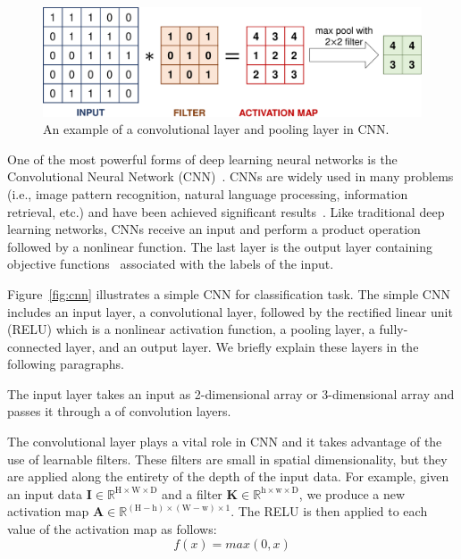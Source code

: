 \begin{figure}[t!]
	\center
	\includegraphics[scale=0.28]{figs/filter_pooling.pdf}
	\caption{An example of a convolutional layer and pooling layer in CNN.}
	\label{fig:filter}
\end{figure}

One of the most powerful forms of deep learning neural networks is the Convolutional Neural Network (CNN)~\cite{lecun2015deep}. CNNs are widely used in many problems (i.e., image pattern recognition, natural language processing, information retrieval, etc.) and have been achieved significant results~\cite{karpathy2014large, lawrence1997face, krizhevsky2012imagenet}. Like traditional deep learning networks, CNNs receive an input and perform a product operation followed by a nonlinear function. The last layer is the output layer containing objective functions~\cite{zhao2017loss} associated with the labels of the input.

Figure~\ref{fig:cnn} illustrates a simple CNN for classification task. The simple CNN includes an input layer, a convolutional layer, followed by the rectified linear unit (RELU) which is a nonlinear activation function, a pooling layer, a fully-connected layer, and an output layer. We briefly explain these layers in the following paragraphs. 

The input layer takes an input as 2-dimensional array or 3-dimensional array and passes it through a of convolution layers.

The convolutional layer plays a vital role in CNN and it takes advantage of the use of learnable filters. These filters are small in spatial dimensionality, but they are applied along the entirety of the depth of the input data. For example, given an input data $\textbf{I} \in \mathbb{R}^{\text{H} \times \text{W} \times \text{D}}$ and a filter $\textbf{K} \in \mathbb{R}^{\text{h} \times \text{w} \times \text{D}}$, we produce a new activation map $\textbf{A} \in \mathbb{R}^{(\text{H} - \text{h}) \times (\text{W} - \text{w}) \times 1}$. The RELU is then applied to each value of the activation map as follows:
\begin{equation}
\label{eq:relu}
f(x) = max(0, x)   
\end{equation}

